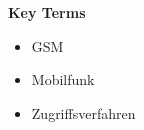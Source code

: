 %
%
% 
% 

{\Large\bfseries Key Terms}
\vspace{0.65cm}

\begin{itemize}
	\setlength{\itemsep}{0pt}
	\item[] GSM
	\item[] Mobilfunk
	\item[] Zugriffsverfahren
\end{itemize}
